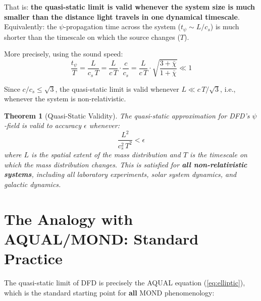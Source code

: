 \documentclass[12pt,a4paper]{article}
\newtheorem{theorem}{Theorem}[section]
\begin{document}
That is: \textbf{the quasi-static limit is valid whenever the system size
is much smaller than the distance light travels in one dynamical timescale}.
Equivalently: the $\psi$-propagation time across the system
($t_\psi \sim L/c_s$) is much shorter than the timescale on which the
source changes ($T$).

More precisely, using the sound speed:
\begin{equation}\label{eq:qs-precise}
\frac{t_\psi}{T} = \frac{L}{c_s\,T}
= \frac{L}{c\,T}\cdot\frac{c}{c_s}
= \frac{L}{c\,T}\cdot\sqrt{\frac{3+\bar\chi}{1+\bar\chi}} \ll 1
\end{equation}

Since $c/c_s \leq \sqrt{3}$, the quasi-static limit is valid whenever
$L \ll c\,T/\sqrt{3}$, i.e., whenever the system is non-relativistic.

\begin{theorem}[Quasi-Static Validity]
\label{thm:qs}
The quasi-static approximation for DFD's $\psi$-field is valid to accuracy
$\epsilon$ whenever:
\begin{equation}
\frac{L^2}{c_s^2\,T^2} < \epsilon
\end{equation}
where $L$ is the spatial extent of the mass distribution and $T$ is the
timescale on which the mass distribution changes. This is satisfied for
\textbf{all non-relativistic systems}, including all laboratory experiments,
solar system dynamics, and galactic dynamics.
\end{theorem}


\section{The Analogy with AQUAL/MOND: Standard Practice}
\label{sec:aqual}

The quasi-static limit of DFD is precisely the AQUAL equation
(\ref{eq:elliptic}), which is the standard starting point for
\textbf{all} MOND phenomenology:
\end{document}
